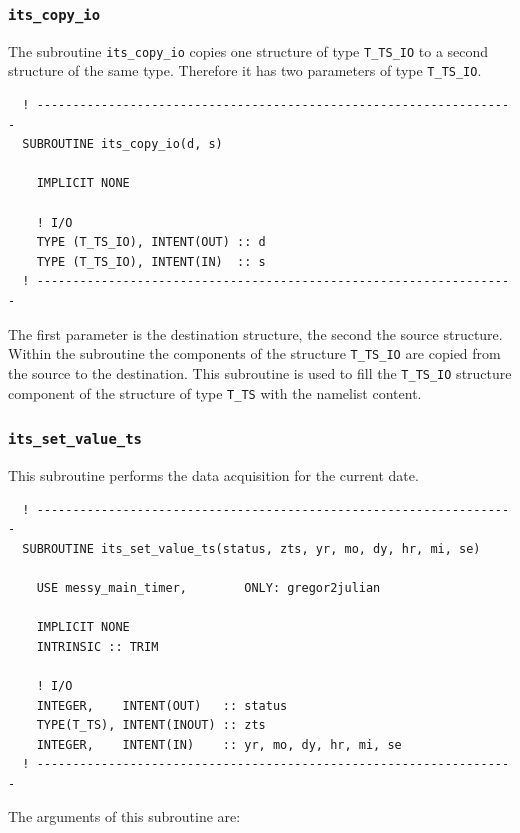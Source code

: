 \documentclass[11pt,twoside]{report}
\begin{document}
\subsubsection{\color{blue} \tt\bf its\_copy\_io\label{ITScopy}}
The subroutine \verb|its_copy_io| copies one structure of
 type \verb|T_TS_IO| to a second structure of the same type. Therefore it
 has two parameters of type \verb|T_TS_IO|.
\begin{verbatim}
  ! -------------------------------------------------------------------
  SUBROUTINE its_copy_io(d, s)

    IMPLICIT NONE

    ! I/O
    TYPE (T_TS_IO), INTENT(OUT) :: d
    TYPE (T_TS_IO), INTENT(IN)  :: s
  ! -------------------------------------------------------------------
\end{verbatim}
The first parameter is the destination structure, the second the
source structure.
Within the subroutine the components of the structure
\verb|T_TS_IO| are copied from the source to the destination.
This subroutine is used to fill the \verb|T_TS_IO| structure component of the
structure of type \verb|T_TS| with the namelist content.

\subsubsection{\color{blue} \tt\bf its\_set\_value\_ts\label{ITSvalue}}
This subroutine performs the data acquisition for the current date.
\begin{verbatim}
  ! -------------------------------------------------------------------
  SUBROUTINE its_set_value_ts(status, zts, yr, mo, dy, hr, mi, se)

    USE messy_main_timer,        ONLY: gregor2julian

    IMPLICIT NONE
    INTRINSIC :: TRIM

    ! I/O
    INTEGER,    INTENT(OUT)   :: status
    TYPE(T_TS), INTENT(INOUT) :: zts
    INTEGER,    INTENT(IN)    :: yr, mo, dy, hr, mi, se
  ! -------------------------------------------------------------------
\end{verbatim}

The arguments of this subroutine are:\\
\end{document}
